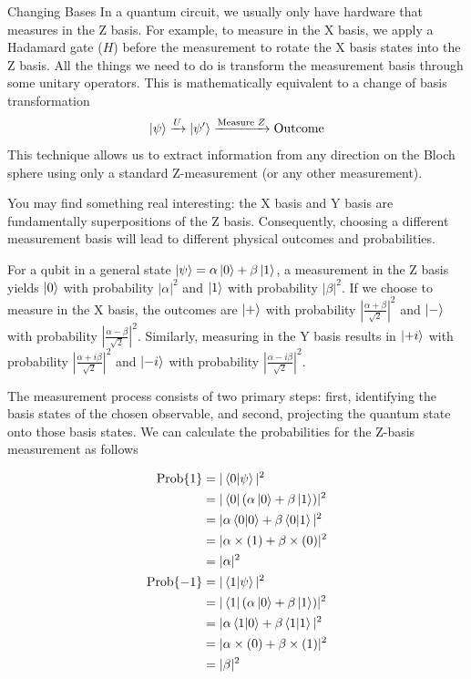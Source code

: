 \documentclass[11pt, letterpaper]{article}
\begin{document}
\begin{SBUBox}{Changing Bases}
In a quantum circuit, we usually only have hardware that measures in the Z basis. For example, to measure in the X basis, we apply a Hadamard gate ($H$) before the measurement to rotate the X basis states into the Z basis. All the things we need to do is transform the measurement basis through some unitary operators. This is mathematically equivalent to a change of basis transformation
\begin{equation*}
\ket{\psi} \xrightarrow{U} \ket{\psi'} \xrightarrow{\text{Measure } Z} \text{Outcome}
\end{equation*}
This technique allows us to extract information from any direction on the Bloch sphere using only a standard Z-measurement (or any other measurement).
\end{SBUBox}

You may find something real interesting: the X basis and Y basis are fundamentally superpositions of the Z basis. Consequently, choosing a different measurement basis will lead to different physical outcomes and probabilities.

For a qubit in a general state $\ket{\psi} = \alpha \ket{0} + \beta \ket{1}$, a measurement in the Z basis yields $\ket{0}$ with probability $|\alpha|^2$ and $\ket{1}$ with probability $|\beta|^2$. If we choose to measure in the X basis, the outcomes are $\ket{+}$ with probability $|\frac{\alpha + \beta}{\sqrt{2}}|^2$ and $\ket{-}$ with probability $|\frac{\alpha - \beta}{\sqrt{2}}|^2$. Similarly, measuring in the Y basis results in $\ket{+i}$ with probability $|\frac{\alpha + i\beta}{\sqrt{2}}|^2$ and $\ket{-i}$ with probability $|\frac{\alpha - i\beta}{\sqrt{2}}|^2$.

The measurement process consists of two primary steps: first, identifying the basis states of the chosen observable, and second, projecting the quantum state onto those basis states. We can calculate the probabilities for the Z-basis measurement as follows

\begin{equation}
  \begin{aligned}
    \text{Prob}\{1\} & = |\braket{0|\psi}|^2 \\
    & = |\bra{0}(\alpha \ket{0} + \beta \ket{1})|^2 \\
    & = |\alpha \braket{0|0} + \beta \braket{0|1}|^2 \\
    & = |\alpha \times (1) + \beta \times (0)|^2 \\
    & = |\alpha|^2 \\
    \text{Prob}\{-1\} & = |\braket{1|\psi}|^2 \\
    & = |\bra{1}(\alpha \ket{0} + \beta \ket{1})|^2 \\
    & = |\alpha \braket{1|0} + \beta \braket{1|1}|^2 \\
    & = |\alpha \times (0) + \beta \times (1)|^2 \\
    & = |\beta|^2
  \end{aligned}
\label{eq: z_basis_measurement}
\end{equation}
\end{document}
